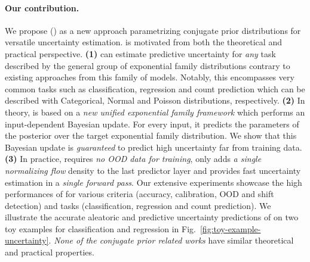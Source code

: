 \paragraph{Our contribution.} We propose \NatPN{} (\NatPNacro{}) as a new approach parametrizing conjugate prior distributions for versatile uncertainty estimation. \NatPNacro{}{} is motivated from both the theoretical and practical perspective. 
\textbf{(1)} \NatPNacro{} can estimate predictive uncertainty for \emph{any} task described by the general group of exponential family distributions contrary to existing approaches from this family of models. Notably, this encompasses very common tasks such as classification, regression and count prediction which can be described with Categorical, Normal and Poisson distributions, respectively. 
\textbf{(2)} In theory, \NatPNacro{} is based on a \emph{new unified exponential family framework} which performs an input-dependent Bayesian update. For every input, it predicts the parameters of the posterior over the target exponential family distribution. We show that this Bayesian update is \emph{guaranteed} to predict high uncertainty far from training data.
\textbf{(3)} In practice, \NatPNacro{} requires \emph{no OOD data for training}, only adds \emph{a single normalizing flow} density to the last predictor layer and provides fast uncertainty estimation in a \emph{single forward pass}. Our extensive experiments showcase the high performances of \NatPNacro{} for various criteria (accuracy, calibration, OOD and shift detection) and tasks (classification, regression and count prediction). We illustrate the accurate aleatoric and predictive uncertainty predictions of \NatPNacro{} on two toy examples for classification and regression in Fig.~\ref{fig:toy-example-uncertainty}. \emph{None of the conjugate prior related works} have similar theoretical and practical properties.

